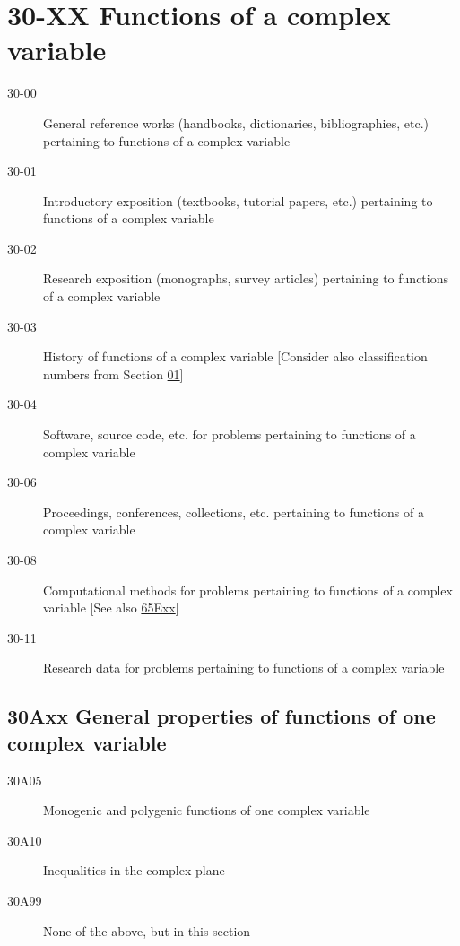 \documentclass[letterpaper]{article}
\begin{document}
\section*{30-XX Functions of a complex variable }\label{30-XX}
\begin{description}
\item [30-00]\label{30-00} General reference works (handbooks, dictionaries, bibliographies, etc.) pertaining to functions of a complex variable
\item [30-01]\label{30-01} Introductory exposition (textbooks, tutorial papers, etc.) pertaining to functions of a complex variable
\item [30-02]\label{30-02} Research exposition (monographs, survey articles) pertaining to functions of a complex variable
\item [30-03]\label{30-03} History of functions of a complex variable [Consider also classification numbers from Section \hyperref[01-XX]{01}]
\item [30-04]\label{30-04} Software, source code, etc. for problems pertaining to functions of a complex variable
\item [30-06]\label{30-06} Proceedings, conferences, collections, etc. pertaining to functions of a complex variable
\item [30-08]\label{30-08} Computational methods for problems pertaining to functions of a complex variable [See also \hyperref[65Exx]{65Exx}]
\item [30-11]\label{30-11} Research data for problems pertaining to functions of a complex variable
\end{description}
\subsection*{30Axx  General properties of functions of one complex variable}\label{30Axx}
\begin{description}  
\item [30A05]\label{30A05} Monogenic and polygenic functions of one complex variable
\item [30A10]\label{30A10} Inequalities in the complex plane 
\item [30A99]\label{30A99} None of the above, but in this section
\end{description}
\end{document}

